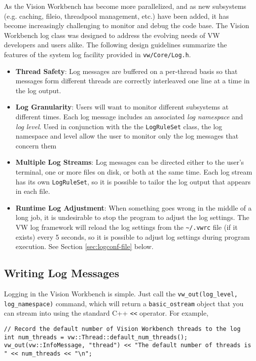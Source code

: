 As the Vision Workbench has become more parallelized, and as new
subsystems (e.g. caching, fileio, threadpool management, etc.) have
been added, it has become increasingly challenging to monitor and
debug the code base.  The Vision Workbench log class was designed to
address the evolving needs of VW developers and users alike.  The
following design guidelines summarize the features of the system log
facility provided in \verb#vw/Core/Log.h#.   

\begin{itemize}
\item {\bf Thread Safety}: Log messages are buffered on a
  per-thread basis so that messages form different threads are
  correctly interleaved one line at a time in the log output.
\item {\bf Log Granularity}: Users will want to monitor different
  subsystems at different times.  Each log message includes an
  associated {\em log namespace} and {\em log level}.  Used in
  conjunction with the the \verb#LogRuleSet# class, the log namespace
  and level allow the user to monitor only the log messages that
  concern them
\item {\bf Multiple Log Streams}: Log messages can be directed either
  to the user's terminal, one or more files on disk, or both at the
  same time.  Each log stream has its own \verb#LogRuleSet#, so it is
  possible to tailor the log output that appears in each file.
\item {\bf Runtime Log Adjustment}: When something goes wrong in the
  middle of a long job, it is undesirable to stop the program to
  adjust the log settings.  The VW log framework will reload the log
  settings from the \verb#~/.vwrc# file (if it exists) every
  5 seconds, so it is possible to adjust log settings during program
  execution.  See Section \ref{sec:logconf-file} below.
\end{itemize}

\subsection{Writing Log Messages}

Logging in the Vision Workbench is simple.  Just call the
\verb#vw_out(log_level, log_namespace)# command, which will return a
\verb#basic_ostream# object that you can stream into using the standard C++
\verb#<<# operator.  For example,

\begin{verbatim}
// Record the default number of Vision Workbench threads to the log
int num_threads = vw::Thread::default_num_threads();
vw_out(vw::InfoMessage, "thread") << "The default number of threads is " << num_threads << "\n";
\end{verbatim}

